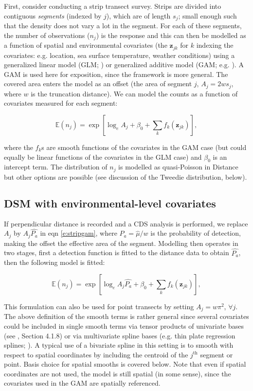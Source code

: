 \documentclass[a4paper,12pt]{article}
\begin{document}
First, consider conducting a strip transect survey. Strips are divided into contiguous \textit{segments} (indexed by $j$), which are of length $s_j$; small enough such that the density does not vary a lot in the segment. For each of these segments, the number of observations ($n_j$) is the response and this can then be modelled as a function of spatial and environmental covariates (the $\mathbf{z}_{jk}$ for $k$ indexing the covariates: e.g. location, sea surface temperature, weather conditions) using a generalized linear model (GLM; \cite{McCullagh:1989ux}) or generalized additive model (GAM; e.g. \cite{Wood:2006wz}). A GAM is used here for exposition, since the framework is more general. The covered area enters the model as an offset (the area of segment $j$, $A_j = 2ws_j$, where $w$ is the truncation distance). We can model the counts as a function of covariates measured for each segment:

\begin{equation}
\mathbb{E}(n_j) = \exp\left[ \log_e A_j + \beta_0 + \sum_k f_k\left(\bm{z}_{jk}\right) \right],
\label{e:stripgam}
\end{equation}

where the $f_k$s are smooth functions of the covariates in the GAM case (but could equally be linear functions of the covariates in the GLM case) and $\beta_0$ is an intercept term. The distribution of $n_j$ is modelled as quasi-Poisson in Distance but other options are possible (see discussion of the Tweedie distribution, below).

\subsection*{DSM with environmental-level covariates}

If perpendicular distance is recorded and a CDS analysis is performed, we replace $A_j$ by $A_j\hat{P_a}$ in eqn \ref{e:stripgam}, where $\hat{P_a}=\hat{\mu}/w$ is the probability of detection, making the offset the effective area of the segment. Modelling then operates in two stages, first a detection function is fitted to the distance data to obtain $\hat{P_a}$, then the following model is fitted:

\begin{equation}
\mathbb{E}(n_j) = \exp\left[ \log_e A_j\hat{P_a} + \beta_0 + \sum_k f_k\left(\bm{z}_{jk}\right) \right],
\label{e:gamn}
\end{equation}

This formulation can also be used for point transects by setting $A_j=w\pi^2$, $\forall j$. The above definition of the smooth terms is rather general since several covariates could be included in single smooth terms via tensor products of univariate bases (see \cite{Wood:2006wz}, Section 4.1.8) or via multivariate spline bases (e.g. thin plate regression splines; \cite{Wood:2003tc}). A typical use of a bivariate spline in this setting is to smooth with respect to spatial coordinates by including the centroid of the $j^\text{th}$ segment or point. Basis choice for spatial smooths is covered below. Note that even if spatial coordinates are not used, the model is still spatial (in some sense), since the covariates used in the GAM are spatially referenced.
\end{document}
